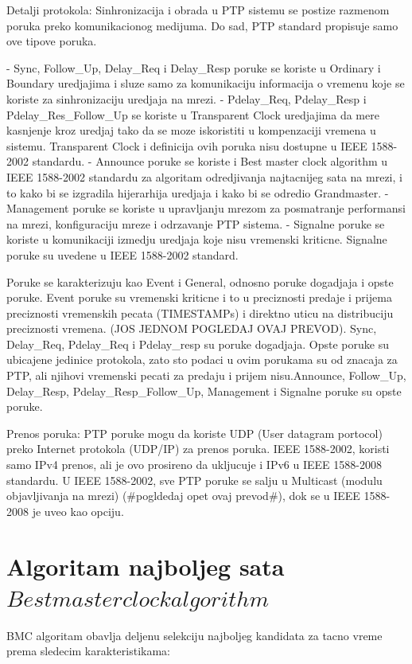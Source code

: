 \documentclass[a4paper,12pt, master]{etf}
\begin{document}
	Detalji protokola:
	Sinhronizacija i obrada u PTP sistemu se postize razmenom poruka preko komunikacionog 
	medijuma. Do sad, PTP standard propisuje samo ove tipove poruka.

	- Sync, Follow\_Up, Delay\_Req i Delay\_Resp poruke se koriste u Ordinary i Boundary 
	uredjajima i sluze samo za komunikaciju informacija o vremenu koje se koriste za 
	sinhronizaciju uredjaja na mrezi.
	- Pdelay\_Req, Pdelay\_Resp i Pdelay\_Res\_Follow\_Up se koriste u Transparent Clock 
	uredjajima da mere kasnjenje kroz uredjaj tako da se moze iskoristiti u kompenzaciji 
	vremena u sistemu. Transparent Clock i definicija ovih poruka nisu dostupne u IEEE 
	1588-2002 standardu.
	- Announce poruke se koriste i Best master clock algorithm u IEEE 1588-2002 standardu za
	algoritam odredjivanja najtacnijeg sata na mrezi, i to kako bi se izgradila hijerarhija
	uredjaja i kako bi se odredio Grandmaster.
	- Management poruke se koriste u upravljanju mrezom za posmatranje performansi na mrezi,
	konfiguraciju mreze i odrzavanje PTP sistema.
	- Signalne poruke se koriste u komunikaciji izmedju uredjaja koje nisu vremenski kriticne.
	Signalne poruke su uvedene u IEEE 1588-2002 standard.

	Poruke se karakterizuju kao Event i General, odnosno poruke dogadjaja i opste poruke. Event
	poruke su vremenski kriticne i to u preciznosti predaje i prijema preciznosti vremenskih 
	pecata (TIMESTAMPs) i direktno uticu na distribuciju preciznosti vremena. (JOS JEDNOM 
	POGLEDAJ OVAJ PREVOD). Sync, Delay\_Req, Pdelay\_Req i Pdelay\_resp su poruke dogadjaja. 
	Opste poruke su ubicajene jedinice protokola, zato sto podaci u ovim porukama su od 
	znacaja za PTP, ali njihovi vremenski pecati za predaju i prijem nisu.Announce, Follow\_Up,
	Delay\_Resp, Pdelay\_Resp\_Follow\_Up, Management i Signalne poruke su opste poruke.

	Prenos poruka:
	PTP poruke mogu da koriste UDP (User datagram portocol) preko Internet protokola (UDP/IP) 
	za prenos poruka. IEEE 1588-2002, koristi samo IPv4 prenos, ali je ovo prosireno da 
	ukljucuje i IPv6 u IEEE 1588-2008 standardu. U IEEE 1588-2002, sve PTP poruke se salju u 
	Multicast (modulu objavljivanja na mrezi) (\#pogldedaj opet ovaj prevod\#), dok se u IEEE 
	1588-2008 je uveo kao opciju.

	\section{Algoritam najboljeg sata \(Best master clock algorithm\)}
	BMC algoritam obavlja deljenu selekciju najboljeg kandidata za tacno vreme prema sledecim
	karakteristikama:
\end{document}
